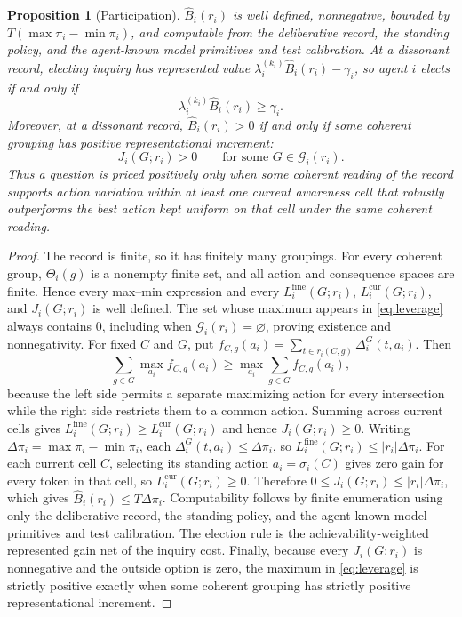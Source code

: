 \documentclass[11pt]{article}
\newtheorem{proposition}[assumption]{Proposition}
\theoremstyle{definition}
\newcommand{\emptysetset}{\varnothing}
\begin{document}
\begin{proposition}[Participation]
\label{prop:participation}
$\widehat B_i(r_i)$ is well defined, nonnegative, bounded by $T(\max \pi_i-\min \pi_i)$, and computable from the deliberative record, the standing policy, and the agent-known model primitives and test calibration.
At a dissonant record, electing inquiry has represented value $\lambda_i^{(k_i)}\widehat B_i(r_i)-\gamma_i$, so agent $i$ elects if and only if
\[
\lambda_i^{(k_i)}\widehat B_i(r_i)\geq\gamma_i.
\]
Moreover, at a dissonant record, $\widehat B_i(r_i)>0$ if and only if some coherent grouping has positive representational increment:
\[
J_i(G;r_i)>0
\qquad\text{for some }G\in\mathcal G_i(r_i).
\]
Thus a question is priced positively only when some coherent reading of the record supports action variation within at least one current awareness cell that robustly outperforms the best action kept uniform on that cell under the same coherent reading.
\end{proposition}

\begin{proof}
The record is finite, so it has finitely many groupings.
For every coherent group, $\Theta_i(g)$ is a nonempty finite set, and all action and consequence spaces are finite.
Hence every max--min expression and every $L_i^{\mathrm{fine}}(G;r_i)$, $L_i^{\mathrm{cur}}(G;r_i)$, and $J_i(G;r_i)$ is well defined.
The set whose maximum appears in \cref{eq:leverage} always contains $0$, including when $\mathcal G_i(r_i)=\emptysetset$, proving existence and nonnegativity.
For fixed $C$ and $G$, put $f_{C,g}(a_i)=\sum_{t\in r_i(C,g)}\Delta_i^G(t,a_i)$.
Then
\[
\sum_{g\in G}\max_{a_i}f_{C,g}(a_i)
\geq
\max_{a_i}\sum_{g\in G}f_{C,g}(a_i),
\]
because the left side permits a separate maximizing action for every intersection while the right side restricts them to a common action.
Summing across current cells gives $L_i^{\mathrm{fine}}(G;r_i)\geq L_i^{\mathrm{cur}}(G;r_i)$ and hence $J_i(G;r_i)\geq0$.
Writing $\Delta \pi_i=\max \pi_i-\min \pi_i$, each $\Delta_i^G(t,a_i)\leq\Delta \pi_i$, so $L_i^{\mathrm{fine}}(G;r_i)\leq\lvert r_i\rvert\Delta \pi_i$.
For each current cell $C$, selecting its standing action $a_i=\sigma_i(C)$ gives zero gain for every token in that cell, so $L_i^{\mathrm{cur}}(G;r_i)\geq0$.
Therefore $0\leq J_i(G;r_i)\leq\lvert r_i\rvert\Delta \pi_i$, which gives $\widehat B_i(r_i)\leq T\Delta \pi_i$.
Computability follows by finite enumeration using only the deliberative record, the standing policy, and the agent-known model primitives and test calibration.
The election rule is the achievability-weighted represented gain net of the inquiry cost.
Finally, because every $J_i(G;r_i)$ is nonnegative and the outside option is zero, the maximum in \cref{eq:leverage} is strictly positive exactly when some coherent grouping has strictly positive representational increment.
\end{proof}
\end{document}
